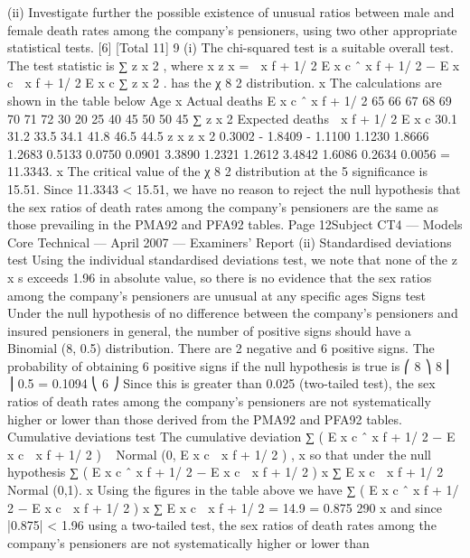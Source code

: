 \documentclass[a4paper,12pt]{article}
\begin{document}
(ii) Investigate further the possible existence of unusual ratios between male and
female death rates among the company’s pensioners, using two other
appropriate statistical tests.
[6]
[Total 11]
9
(i)
The chi-squared test is a suitable overall test.
The test statistic is
∑ z x 2 , where
x
z x =
 x f + 1/ 2
E x c \mu  ˆ x f + 1/ 2 − E x c \mu 
 x f + 1/ 2
E x c \mu 
∑ z x 2
.
has the χ 8 2 distribution.
x
The calculations are shown in the table below
Age
x Actual
deaths
E x c \mu  ˆ x f + 1/ 2
65
66
67
68
69
70
71
72 30
20
25
40
45
50
50
45
∑ z x 2
Expected
deaths
 x f + 1/ 2
E x c 
30.1
31.2
33.5
34.1
41.8
46.5
44.5
z x z x 2
0.3002
- 1.8409
- 1.1100
1.1230
1.8666
1.2683
0.5133
0.0750 0.0901
3.3890
1.2321
1.2612
3.4842
1.6086
0.2634
0.0056
= 11.3343.
x
The critical value of the χ 8 2 distribution at the 5%
significance is 15.51.
Since 11.3343 < 15.51, we have no reason to reject the null hypothesis that the
sex ratios of death rates among the company’s pensioners are the same as
those prevailing in the PMA92 and PFA92 tables.
Page 12Subject CT4 — Models Core Technical — April 2007 — Examiners’ Report
(ii)
Standardised deviations test
Using the individual standardised deviations test, we note that none of the z x s
exceeds 1.96 in absolute value, so there is no evidence that the sex ratios
among the company’s pensioners are unusual at any specific ages
Signs test
Under the null hypothesis of no difference between the company’s pensioners
and insured pensioners in general, the number of positive signs should have a
Binomial (8, 0.5) distribution.
There are 2 negative and 6 positive signs.
The probability of obtaining 6 positive signs if the null hypothesis is true is
⎛ 8 ⎞ 8
⎜ ⎟ 0.5 = 0.1094
⎝ 6 ⎠
Since this is greater than 0.025 (two-tailed test), the sex ratios of death rates
among the company’s pensioners are not systematically higher or lower than
those derived from the PMA92 and PFA92 tables.
Cumulative deviations test
The cumulative deviation
∑ ( E x c \mu  ˆ x f + 1/ 2 − E x c \mu   x f + 1/ 2 ) ~ Normal (0, E x c \mu   x f + 1/ 2 ) ,
x
so that under the null hypothesis
∑ ( E x c \mu  ˆ x f + 1/ 2 − E x c \mu   x f + 1/ 2 )
x
∑ E x c \mu   x f + 1/ 2
~ Normal (0,1).
x
Using the figures in the table above we have
∑ ( E x c \mu  ˆ x f + 1/ 2 − E x c \mu   x f + 1/ 2 )
x
∑ E x c \mu   x f + 1/ 2
=
14.9
= 0.875
290
x
and since |0.875| < 1.96 using a two-tailed test, the sex ratios of death rates
among the company’s pensioners are not systematically higher or lower than
\end{document}
